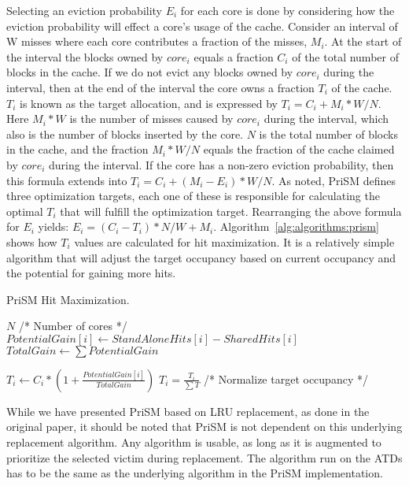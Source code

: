 Selecting an eviction probability $E_i$ for each core is done by considering how the eviction probability will effect a core's usage of the cache.
Consider an interval of W misses where each core contributes a fraction of the misses, $M_i$.
At the start of the interval the blocks owned by $core_i$ equals a fraction $C_i$ of the total number of blocks in the cache.
If we do not evict any blocks owned by $core_i$ during the interval, then at the end of the interval the core owns a fraction $T_i$ of the cache.
$T_i$ is known as the target allocation, and is expressed by $T_i = C_i + M_i * W/N$. 
Here $M_i * W$ is the number of misses caused by $core_i$ during the interval, which also is the number of blocks inserted by the core.
$N$ is the total number of blocks in the cache, and the fraction $M_i * W/N$ equals the fraction of the cache claimed by $core_i$ during the interval.
If the core has a non-zero eviction probability, then this formula extends into $T_i = C_i + (M_i - E_i) * W/N$.
As noted, PriSM defines three optimization targets, each one of these is responsible for calculating the optimal $T_i$ that will fulfill the optimization target.
Rearranging the above formula for $E_i$ yields: $E_i = (C_i - T_i) * N/W + M_i$.
Algorithm~\ref{alg:algorithms:prism} shows how $T_i$ values are calculated for hit maximization.
It is a relatively simple algorithm that will adjust the target occupancy based on current occupancy and the potential for gaining more hits.

\begin{algorithm}[ht]
\caption{PriSM Hit Maximization.}
\label{alg:algorithms:prism}
\begin{algorithmic}[1]
\State $N$ /* Number of cores */
    \State $PotentialGain[i]\gets StandAloneHits[i] - SharedHits[i]$
\EndFor
\State $TotalGain\gets \sum{PotentialGain}$

    \State $T_i\gets C_i * (1 + \frac{PotentialGain[i]}{TotalGain})$
\EndFor
\State $T_i = \frac{T_i}{\sum{T}}$ /* Normalize target occupancy */
\end{algorithmic}
\end{algorithm}

While we have presented PriSM based on LRU replacement, as done in the original paper, it should be noted that PriSM is not dependent on this underlying replacement algorithm.
Any algorithm is usable, as long as it is augmented to prioritize the selected victim during replacement.
The algorithm run on the ATDs has to be the same as the underlying algorithm in the PriSM implementation.
